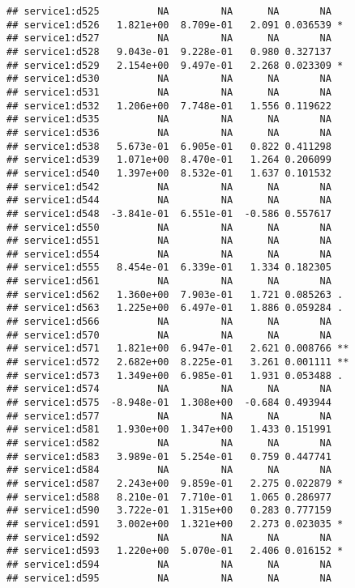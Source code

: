 \documentclass[
]{article}
\begin{document}
\begin{verbatim}
## service1:d525          NA         NA      NA       NA    
## service1:d526   1.821e+00  8.709e-01   2.091 0.036539 *  
## service1:d527          NA         NA      NA       NA    
## service1:d528   9.043e-01  9.228e-01   0.980 0.327137    
## service1:d529   2.154e+00  9.497e-01   2.268 0.023309 *  
## service1:d530          NA         NA      NA       NA    
## service1:d531          NA         NA      NA       NA    
## service1:d532   1.206e+00  7.748e-01   1.556 0.119622    
## service1:d535          NA         NA      NA       NA    
## service1:d536          NA         NA      NA       NA    
## service1:d538   5.673e-01  6.905e-01   0.822 0.411298    
## service1:d539   1.071e+00  8.470e-01   1.264 0.206099    
## service1:d540   1.397e+00  8.532e-01   1.637 0.101532    
## service1:d542          NA         NA      NA       NA    
## service1:d544          NA         NA      NA       NA    
## service1:d548  -3.841e-01  6.551e-01  -0.586 0.557617    
## service1:d550          NA         NA      NA       NA    
## service1:d551          NA         NA      NA       NA    
## service1:d554          NA         NA      NA       NA    
## service1:d555   8.454e-01  6.339e-01   1.334 0.182305    
## service1:d561          NA         NA      NA       NA    
## service1:d562   1.360e+00  7.903e-01   1.721 0.085263 .  
## service1:d563   1.225e+00  6.497e-01   1.886 0.059284 .  
## service1:d566          NA         NA      NA       NA    
## service1:d570          NA         NA      NA       NA    
## service1:d571   1.821e+00  6.947e-01   2.621 0.008766 ** 
## service1:d572   2.682e+00  8.225e-01   3.261 0.001111 ** 
## service1:d573   1.349e+00  6.985e-01   1.931 0.053488 .  
## service1:d574          NA         NA      NA       NA    
## service1:d575  -8.948e-01  1.308e+00  -0.684 0.493944    
## service1:d577          NA         NA      NA       NA    
## service1:d581   1.930e+00  1.347e+00   1.433 0.151991    
## service1:d582          NA         NA      NA       NA    
## service1:d583   3.989e-01  5.254e-01   0.759 0.447741    
## service1:d584          NA         NA      NA       NA    
## service1:d587   2.243e+00  9.859e-01   2.275 0.022879 *  
## service1:d588   8.210e-01  7.710e-01   1.065 0.286977    
## service1:d590   3.722e-01  1.315e+00   0.283 0.777159    
## service1:d591   3.002e+00  1.321e+00   2.273 0.023035 *  
## service1:d592          NA         NA      NA       NA    
## service1:d593   1.220e+00  5.070e-01   2.406 0.016152 *  
## service1:d594          NA         NA      NA       NA    
## service1:d595          NA         NA      NA       NA    

\end{verbatim}
\end{document}
